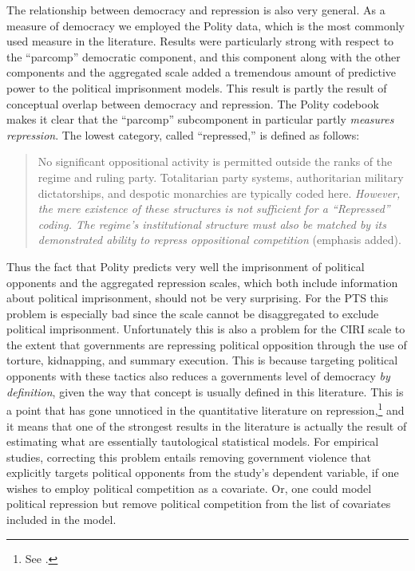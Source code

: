 \documentclass[12pt]{article}
\begin{document}
The relationship between democracy and repression is also very general. As a measure of democracy we employed the Polity data, which is the most commonly used measure in the literature. Results were particularly strong with respect to the ``parcomp'' democratic component, and this component along with the other components and the aggregated scale added a tremendous amount of predictive power to the political imprisonment models. This result is partly the result of conceptual overlap between democracy and repression. The Polity codebook \citep[][p.\ 26]{MarshallJaggers2009} makes it clear that the ``parcomp'' subcomponent in particular partly {\it measures repression}. The lowest category, called ``repressed,'' is defined as follows:
\begin{quote}
No significant oppositional activity is permitted outside the ranks of the regime and ruling party. Totalitarian party systems, authoritarian military dictatorships, and despotic monarchies are typically coded here. {\it However, the mere existence of these structures is not sufficient for a ``Repressed'' coding. The regime's institutional structure must also be matched by its demonstrated ability to repress oppositional competition} (emphasis added).
\end{quote}
Thus the fact that Polity predicts very well the imprisonment of political opponents and the aggregated repression scales, which both include information about political imprisonment, should not be very surprising. For the PTS this problem is especially bad since the scale cannot be disaggregated to exclude political imprisonment. Unfortunately this is also a problem for the CIRI scale to the extent that governments are repressing political opposition through the use of torture, kidnapping, and summary execution. This is because targeting political opponents with these tactics also reduces a governments level of democracy {\it by definition}, given the way that concept is usually defined in this literature. This is a point that has gone unnoticed in the quantitative literature on repression,\footnote{See \citet{Hill2013}.} and it means that one of the strongest results in the literature is actually the result of estimating what are essentially tautological statistical models. For empirical studies, correcting this problem entails removing government violence that explicitly targets political opponents from the study's dependent variable, if one wishes to employ political competition as a covariate. Or, one could model political repression but remove political competition from the list of covariates included in the model. 
\end{document}
